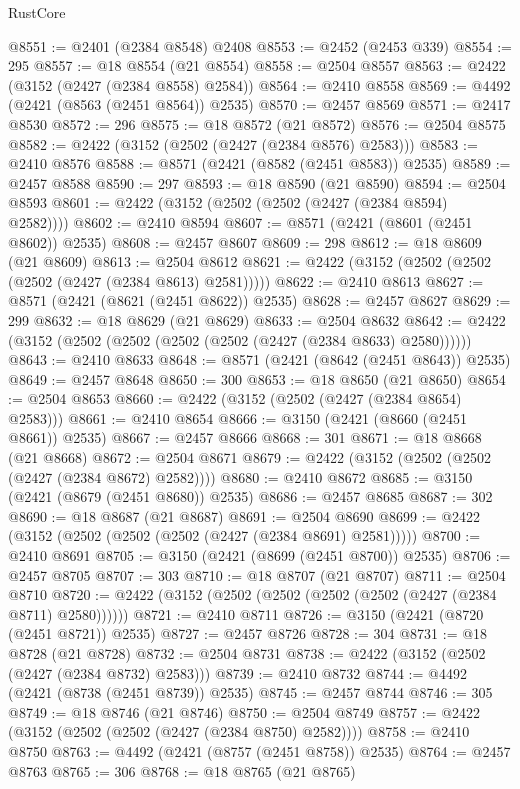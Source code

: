 \begin{lexlean}{RustCore}
\begin{coremodule}
@8551 := @2401 (@2384 @8548) @2408
@8553 := @2452 (@2453 @339)
@8554 := 295
@8557 := @18 @8554 (@21 @8554)
@8558 := @2504 @8557
@8563 := @2422 (@3152 (@2427 (@2384 @8558) @2584))
@8564 := @2410 @8558
@8569 := @4492 (@2421 (@8563 (@2451 @8564)) @2535)
@8570 := @2457 @8569
@8571 := @2417 @8530
@8572 := 296
@8575 := @18 @8572 (@21 @8572)
@8576 := @2504 @8575
@8582 := @2422 (@3152 (@2502 (@2427 (@2384 @8576) @2583)))
@8583 := @2410 @8576
@8588 := @8571 (@2421 (@8582 (@2451 @8583)) @2535)
@8589 := @2457 @8588
@8590 := 297
@8593 := @18 @8590 (@21 @8590)
@8594 := @2504 @8593
@8601 := @2422 (@3152 (@2502 (@2502 (@2427 (@2384 @8594) @2582))))
@8602 := @2410 @8594
@8607 := @8571 (@2421 (@8601 (@2451 @8602)) @2535)
@8608 := @2457 @8607
@8609 := 298
@8612 := @18 @8609 (@21 @8609)
@8613 := @2504 @8612
@8621 := @2422 (@3152 (@2502 (@2502 (@2502 (@2427 (@2384 @8613) @2581)))))
@8622 := @2410 @8613
@8627 := @8571 (@2421 (@8621 (@2451 @8622)) @2535)
@8628 := @2457 @8627
@8629 := 299
@8632 := @18 @8629 (@21 @8629)
@8633 := @2504 @8632
@8642 := @2422 (@3152 (@2502 (@2502 (@2502 (@2502 (@2427 (@2384 @8633) @2580))))))
@8643 := @2410 @8633
@8648 := @8571 (@2421 (@8642 (@2451 @8643)) @2535)
@8649 := @2457 @8648
@8650 := 300
@8653 := @18 @8650 (@21 @8650)
@8654 := @2504 @8653
@8660 := @2422 (@3152 (@2502 (@2427 (@2384 @8654) @2583)))
@8661 := @2410 @8654
@8666 := @3150 (@2421 (@8660 (@2451 @8661)) @2535)
@8667 := @2457 @8666
@8668 := 301
@8671 := @18 @8668 (@21 @8668)
@8672 := @2504 @8671
@8679 := @2422 (@3152 (@2502 (@2502 (@2427 (@2384 @8672) @2582))))
@8680 := @2410 @8672
@8685 := @3150 (@2421 (@8679 (@2451 @8680)) @2535)
@8686 := @2457 @8685
@8687 := 302
@8690 := @18 @8687 (@21 @8687)
@8691 := @2504 @8690
@8699 := @2422 (@3152 (@2502 (@2502 (@2502 (@2427 (@2384 @8691) @2581)))))
@8700 := @2410 @8691
@8705 := @3150 (@2421 (@8699 (@2451 @8700)) @2535)
@8706 := @2457 @8705
@8707 := 303
@8710 := @18 @8707 (@21 @8707)
@8711 := @2504 @8710
@8720 := @2422 (@3152 (@2502 (@2502 (@2502 (@2502 (@2427 (@2384 @8711) @2580))))))
@8721 := @2410 @8711
@8726 := @3150 (@2421 (@8720 (@2451 @8721)) @2535)
@8727 := @2457 @8726
@8728 := 304
@8731 := @18 @8728 (@21 @8728)
@8732 := @2504 @8731
@8738 := @2422 (@3152 (@2502 (@2427 (@2384 @8732) @2583)))
@8739 := @2410 @8732
@8744 := @4492 (@2421 (@8738 (@2451 @8739)) @2535)
@8745 := @2457 @8744
@8746 := 305
@8749 := @18 @8746 (@21 @8746)
@8750 := @2504 @8749
@8757 := @2422 (@3152 (@2502 (@2502 (@2427 (@2384 @8750) @2582))))
@8758 := @2410 @8750
@8763 := @4492 (@2421 (@8757 (@2451 @8758)) @2535)
@8764 := @2457 @8763
@8765 := 306
@8768 := @18 @8765 (@21 @8765)

\end{coremodule}
\end{lexlean}
